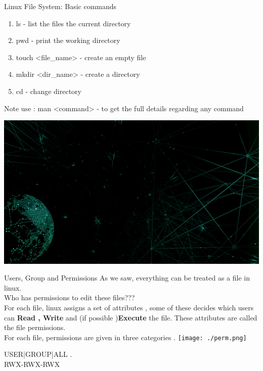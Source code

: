 \documentclass{beamer}
\begin{document}
{\selectfont
\begin{frame}{Linux File System:  Basic commands}
\begin{enumerate}
	\item<2->ls  - list the files the current directory
	\item<3->pwd - print the working directory
	\item<4->touch <file\_name> - create an empty file 
	\item<5->mkdir <dir\_name> - create a directory
	\item<6->cd 	- change directory 
\end{enumerate}
	\begin{alertblock}{Note}
		{use : man <command> - to get the full details regarding any command }
	\end{alertblock}
\end{frame}
}
{
	\usebackgroundtemplate%
	{%
	    \includegraphics[width=\paperwidth,height=\paperheight]{./back_net.jpg}%
	}
\selectfont
\begin{frame}{Users, Group and Permissions}
	As we saw, everything can be treated as a file in linux. \\
	\pause
	Who has permissions to edit these files???\\
	\pause
	For each file, linux assigns a set of attributes , some of these decides which users can {\textbf{Read , Write}} and (if possible )\textbf{Execute} the file. These attributes are called the file permissions. \\
	\pause
	For each file, permissions are given in three categories .
	\texttt{[image: ./perm.png]}%

	\vskip 1cm
			USER|GROUP|ALL . \\
			 RWX-RWX-RWX\\
			
\end{frame}
}
\end{document}

